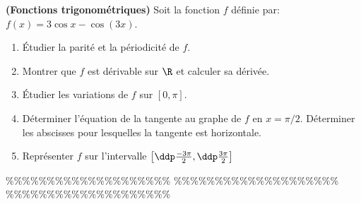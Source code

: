 



\begin{exercice}  \;
\textbf{(Fonctions trigonom\'etriques)}
Soit la fonction $f$ d\'efinie par: $f(x)=3\cos x-\cos (3x)$.
\begin{enumerate}
\item \'Etudier la parité et la périodicité de $f$.
\item Montrer que $f$ est dérivable sur $\R$ et calculer sa
dérivée.
\item \'Etudier les variations de $f$ sur $[0,\pi]$.
\item Déterminer l'équation de la tangente au graphe de $f$ en
$x=\pi/2$. Déterminer les abscisses pour lesquelles la tangente est
horizontale. \item Représenter $f$ sur l'intervalle
$\left\lbrack \ddp\frac{-3\pi}{2},\ddp\frac{3\pi}{2}\right\rbrack$ \end{enumerate}
\end{exercice}


\%\%\%\%\%\%\%\%\%\%\%\%\%\%\%\%\%\%\%\%
\%\%\%\%\%\%\%\%\%\%\%\%\%\%\%\%\%\%\%\%
\%\%\%\%\%\%\%\%\%\%\%\%\%\%\%\%\%\%\%\%



